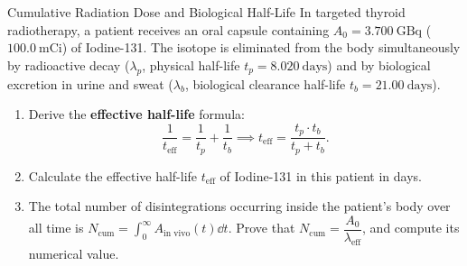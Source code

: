 \begin{exercise}{Cumulative Radiation Dose and Biological Half-Life}
In targeted thyroid radiotherapy, a patient receives an oral capsule containing $A_0 = 3.700\ \mathrm{GBq}$ ($100.0\ \mathrm{mCi}$) of Iodine-131. The isotope is eliminated from the body simultaneously by radioactive decay ($\lambda_p$, physical half-life $t_{p} = 8.020\ \mathrm{days}$) and by biological excretion in urine and sweat ($\lambda_b$, biological clearance half-life $t_{b} = 21.00\ \mathrm{days}$).
\begin{enumerate}[leftmargin=1.5em,itemsep=2pt]
  \item Derive the \textbf{effective half-life} formula:
  \[
  \frac{1}{t_{\text{eff}}} = \frac{1}{t_p} + \frac{1}{t_b} \implies t_{\text{eff}} = \frac{t_p \cdot t_b}{t_p + t_b}.
  \]
  \item Calculate the effective half-life $t_{\text{eff}}$ of Iodine-131 in this patient in days.
  \item The total number of disintegrations occurring inside the patient's body over all time is $N_{\text{cum}} = \int_0^\infty A_{\text{in vivo}}(t) \dd t$. Prove that $N_{\text{cum}} = \dfrac{A_0}{\lambda_{\text{eff}}}$, and compute its numerical value.
\end{enumerate}
\end{exercise}

\begin{tabletworkspace}[5.0cm]
\end{tabletworkspace}

